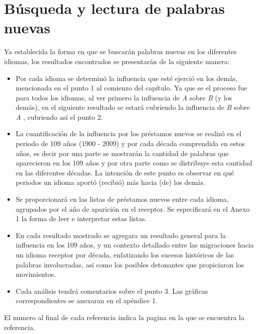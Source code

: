 \section{Búsqueda y lectura de palabras nuevas} %
Ya establecida la forma en que se buscarán  palabras nuevas en los diferentes
idiomas,  los resultados encontrados se presentarán de la siguiente manera:
\begin{itemize}
\item Por cada idioma se determinó la influencia que esté ejerció en los demás,
mencionada en el punto 1 al comienzo del capítulo.   Ya que se el proceso fue
para todos los idiomas,  al ver primero la influencia de \textit{A} sobre
\textit{B}  (y los demás),  en el siguiente resultado se estará cubriendo la
influencia  de \textit{B}  sobre \textit{A} , cubriendo así el punto 2. 
\item La cuantificación de la influencia por los préstamos nuevos se realizó en
el periodo de 109 años (1900 - 2009) y por cada década comprendida en estos
años, es decir por una parte se mostrarán la cantidad de palabras que
aparecieron en los 109 años y por otra parte como se distribuye esta cantidad
en las diferentes décadas.  La intención de este punto es observar en qué
periodos un idioma aportó (recibió) más  hacia (de) los demás.
\item Se proporcionará en \cite{prestamos_nuevos} las listas  de préstamos
nuevos entre cada idioma, agrupados por el año de aparición en el receptor.  Se
especificará en el Anexo 1  la forma de leer e interpretar estas listas.
\item En cada resultado mostrado se agregara un resultado general para la
influencia en los 109 años, y un contexto detallado entre las migraciones hacia
un idioma receptor por década,  enfatizando los sucesos históricos de las
palabras involucradas, así como los posibles detonantes que propiciaron los
movimientos. 
\item Cada análisis tendrá comentarios sobre el punto 3. Las gráficas
correspondientes se anexaran en el apéndice 1.
\end{itemize}

\begin{tcolorbox}
	[colback=red!5!white,colframe=red!75!black]
	El numero al final de cada referencia indica la pagina en la que se encuentra la referencia.
\end{tcolorbox}

